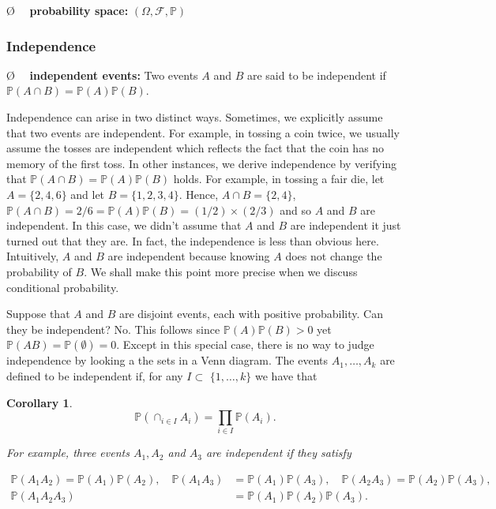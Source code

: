 \documentclass[13pt]{article}
\newtheorem{corollary}[theorem]{Corollary}
\theoremstyle{definition}
\theoremstyle{remark}
\newenvironment{remark}
  {\pushQED{\qed}\renewcommand{\qedsymbol}{$\triangle$}\remarkx}
  {\popQED\endremarkx}
\newenvironment{point}
  {\O~~}
  {}
\newcommand{\PP}{\mathbb{P}}
\begin{document}
\begin{point}
    \textbf{probability space:} $(\Omega,\mathcal{F},\PP)$

\end{point}

\subsubsection{Independence}
\begin{point}
    \textbf{independent events:} Two events $A$ and $B$ are said to be independent if $\PP(A \cap B)=\PP(A) \PP(B)$. 

\end{point}

\begin{remark}\hfill

    Independence can arise in two distinct ways. Sometimes, we explicitly assume that two events are independent. For example, in tossing a coin twice, we usually assume the tosses are independent which reflects the fact that the coin has no memory of the first toss. In other instances, we derive independence by verifying that $\PP(A \cap B)=\PP(A) \PP(B)$ holds. For example, in tossing a fair die, let $A=\{2,4,6\}$ and let $B=\{1,2,3,4\}$. Hence, $A \cap B=\{2,4\}$, $\PP(A\cap B)=2 / 6=\PP(A) \PP(B)=(1 / 2) \times(2 / 3)$ and so $A$ and $B$ are independent. In this case, we didn't assume that $A$ and $B$ are independent it just turned out that they are. In fact, the independence is less than obvious here. Intuitively, $A$ and $B$ are independent because knowing $A$ does not change the probability of $B$. We shall make this point more precise when we discuss conditional probability.

Suppose that $A$ and $B$ are disjoint events, each with positive probability. Can they be independent? No. This follows since $\PP(A) \PP(B)>0$ yet $\PP(A B)=\PP(\emptyset)=0$. Except in this special case, there is no way to judge independence by looking a the sets in a Venn diagram. The events $A_{1}, \ldots, A_{k}$ are defined to be independent if, for any $I \subset$ $\{1, \ldots, k\}$ we have that

\end{remark}

\begin{corollary}
$$
\PP\left(\cap_{i \in I} A_{i}\right)=\prod_{i \in I} \PP\left(A_{i}\right) .
$$

For example, three events $A_{1}, A_{2}$ and $A_{3}$ are independent if they satisfy

$$
\begin{aligned}
\PP\left(A_{1} A_{2}\right)  =\PP\left(A_{1}\right) \PP\left(A_{2}\right), \quad
\PP\left(A_{1} A_{3}\right) & =\PP\left(A_{1}\right) \PP\left(A_{3}\right), \quad
\PP\left(A_{2} A_{3}\right) =\PP\left(A_{2}\right) \PP\left(A_{3}\right), \\
\PP\left(A_{1} A_{2} A_{3}\right) & =\PP\left(A_{1}\right) \PP\left(A_{2}\right) \PP\left(A_{3}\right) .
\end{aligned}
$$
\end{corollary}
\end{document}

